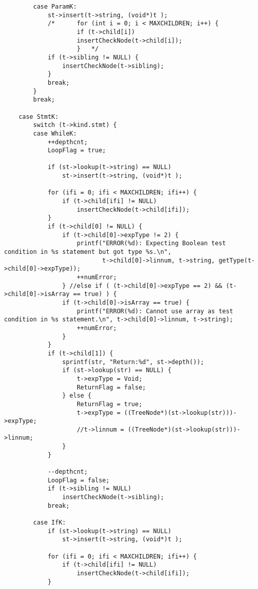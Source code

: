 \documentclass[12pt]{book}
\begin{document}
\begin{lstlisting}
        case ParamK:
            st->insert(t->string, (void*)t );
            /*      for (int i = 0; i < MAXCHILDREN; i++) {
                    if (t->child[i])
                    insertCheckNode(t->child[i]);
                    }   */
            if (t->sibling != NULL) {   
                insertCheckNode(t->sibling);
            }  
            break;
        }
        break;

    case StmtK:   
        switch (t->kind.stmt) {
        case WhileK:
            ++depthcnt;
            LoopFlag = true;

            if (st->lookup(t->string) == NULL)   
                st->insert(t->string, (void*)t );  

            for (ifi = 0; ifi < MAXCHILDREN; ifi++) {
                if (t->child[ifi] != NULL)
                    insertCheckNode(t->child[ifi]);
            }
            if (t->child[0] != NULL) {
                if (t->child[0]->expType != 2) {
                    printf("ERROR(%d): Expecting Boolean test condition in %s statement but got type %s.\n", 
                           t->child[0]->linnum, t->string, getType(t->child[0]->expType));
                    ++numError;
                } //else if ( (t->child[0]->expType == 2) && (t->child[0]->isArray == true) ) {
                if (t->child[0]->isArray == true) {
                    printf("ERROR(%d): Cannot use array as test condition in %s statement.\n", t->child[0]->linnum, t->string);
                    ++numError;
                } 
            }
            if (t->child[1]) {
                sprintf(str, "Return:%d", st->depth());
                if (st->lookup(str) == NULL) {
                    t->expType = Void;
                    ReturnFlag = false;
                } else {
                    ReturnFlag = true;
                    t->expType = ((TreeNode*)(st->lookup(str)))->expType;
                    //t->linnum = ((TreeNode*)(st->lookup(str)))->linnum;
                }
            }

            --depthcnt;
            LoopFlag = false;
            if (t->sibling != NULL)
                insertCheckNode(t->sibling);
            break;

        case IfK:
            if (st->lookup(t->string) == NULL)   
                st->insert(t->string, (void*)t );  

            for (ifi = 0; ifi < MAXCHILDREN; ifi++) {
                if (t->child[ifi] != NULL)
                    insertCheckNode(t->child[ifi]);
            }


\end{lstlisting}
\end{document}
